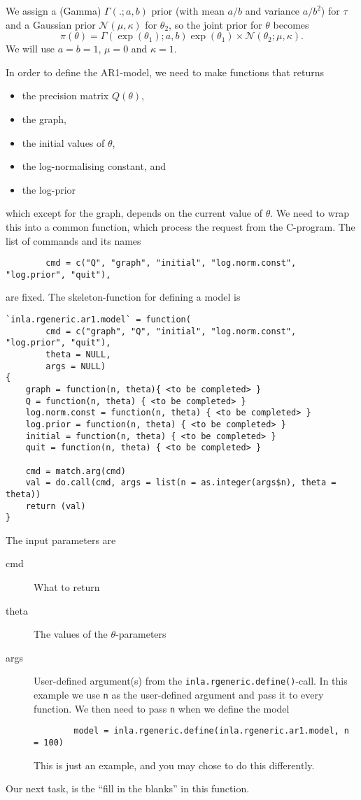 \documentclass[a4paper,11pt]{article}
\begin{document}
We assign a (Gamma) $\Gamma(.; a,b)$ prior (with mean $a/b$ and
variance $a/b^{2}$) for $\tau$ and a Gaussian prior
${\mathcal N}(\mu,\kappa)$ for $\theta_{2}$, so the joint prior for
$\theta$ becomes
\begin{displaymath}
    \pi(\theta) = \Gamma(\exp(\theta_1); a,b) \exp(\theta_1) \times
    {\mathcal N}(\theta_{2}; \mu, \kappa).
\end{displaymath}
We will use $a=b=1$, $\mu=0$ and $\kappa=1$.

In order to define the AR1-model, we need to make functions that
returns
\begin{itemize}
\item the precision matrix $Q(\theta)$,
\item the graph,
\item the initial values of $\theta$,
\item the log-normalising constant, and
\item the log-prior
\end{itemize}
which except for the graph, depends on the current value of
$\theta$. We need to wrap this into a common function, which process
the request from the C-program. The list of commands and its names
{\small
\begin{verbatim}
        cmd = c("Q", "graph", "initial", "log.norm.const", "log.prior", "quit"),
\end{verbatim}
}
are fixed.  The skeleton-function for defining a model is 
{\small
\begin{verbatim}
`inla.rgeneric.ar1.model` = function(
        cmd = c("graph", "Q", "initial", "log.norm.const", "log.prior", "quit"),
        theta = NULL,
        args = NULL)
{
    graph = function(n, theta){ <to be completed> }
    Q = function(n, theta) { <to be completed> }
    log.norm.const = function(n, theta) { <to be completed> }
    log.prior = function(n, theta) { <to be completed> }
    initial = function(n, theta) { <to be completed> }
    quit = function(n, theta) { <to be completed> }

    cmd = match.arg(cmd)
    val = do.call(cmd, args = list(n = as.integer(args$n), theta = theta))
    return (val)
}
\end{verbatim}
}
The input parameters are
\begin{description}
\item[cmd] What to return
\item[theta] The values of the $\theta$-parameters
\item[args] User-defined argument(s) from the
    \texttt{inla.rgeneric.define()}-call. In this example we use
    \texttt{n} as the user-defined argument and
    pass it to every function. We then need to pass \texttt{n} 
    when we define the model
{\small
\begin{verbatim}
        model = inla.rgeneric.define(inla.rgeneric.ar1.model, n = 100)
\end{verbatim}
}
    This is just an example, and you may chose to do this differently.
\end{description}
Our next task, is the ``fill in the blanks'' in this function.
\end{document}
